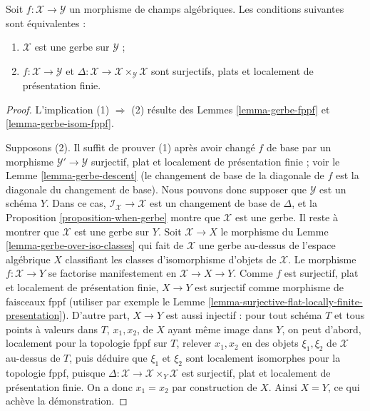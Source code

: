\begin{proposition}
\label{proposition-when-gerbe-over}
Soit $f : \mathcal{X} \to \mathcal{Y}$ un morphisme de champs algébriques.
Les conditions suivantes sont équivalentes :
\begin{enumerate}
\item $\mathcal{X}$ est une gerbe sur $\mathcal{Y}$ ;
\item $f : \mathcal{X} \to \mathcal{Y}$ et
$\Delta : \mathcal{X} \to \mathcal{X} \times_\mathcal{Y} \mathcal{X}$
sont surjectifs, plats et localement de présentation finie.
\end{enumerate}
\end{proposition}

\begin{proof}
L'implication (1) $\Rightarrow$ (2) résulte des
Lemmes \ref{lemma-gerbe-fppf} et \ref{lemma-gerbe-isom-fppf}.

\medskip\noindent
Supposons (2). Il suffit de prouver (1) après avoir changé $f$ de base par un
morphisme $\mathcal{Y}' \to \mathcal{Y}$ surjectif, plat et localement de
présentation finie ; voir le Lemme \ref{lemma-gerbe-descent} (le changement
de base de la diagonale de $f$ est la diagonale du changement de base). Nous
pouvons donc supposer que $\mathcal{Y}$ est un schéma $Y$. Dans ce cas,
$\mathcal{I}_\mathcal{X} \to \mathcal{X}$ est un changement de base de
$\Delta$, et la Proposition \ref{proposition-when-gerbe} montre que
$\mathcal{X}$ est une gerbe. Il reste à montrer que $\mathcal{X}$ est une
gerbe sur $Y$. Soit $\mathcal{X} \to X$ le morphisme du
Lemme \ref{lemma-gerbe-over-iso-classes} qui fait de $\mathcal{X}$ une gerbe
au-dessus de l'espace algébrique $X$ classifiant les classes d'isomorphisme
d'objets de $\mathcal{X}$. Le morphisme $f : \mathcal{X} \to Y$ se factorise
manifestement en $\mathcal{X} \to X \to Y$. Comme $f$ est surjectif, plat et
localement de présentation finie, $X \to Y$ est surjectif comme morphisme de
faisceaux fppf (utiliser par exemple le
Lemme \ref{lemma-surjective-flat-locally-finite-presentation}). D'autre part,
$X \to Y$ est aussi injectif : pour tout schéma $T$ et tous points à valeurs
dans $T$, $x_1, x_2$, de $X$ ayant même image dans $Y$, on peut
d'abord, localement pour la topologie fppf sur $T$, relever $x_1, x_2$ en des
objets $\xi_1, \xi_2$ de $\mathcal{X}$ au-dessus de $T$, puis déduire que
$\xi_1$ et $\xi_2$ sont localement isomorphes pour la topologie fppf, puisque
$\Delta : \mathcal{X} \to \mathcal{X} \times_Y \mathcal{X}$
est surjectif, plat et localement de présentation finie. On a donc
$x_1 = x_2$ par construction de $X$. Ainsi $X = Y$, ce qui achève la
démonstration.
\end{proof}

